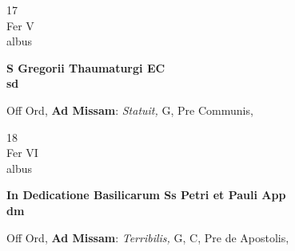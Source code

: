 \documentclass[10pt, openany]{book}
\begin{document}
        \begin{center}
            \begin{minipage}{3.5in}
                \vspace{2em}
                \begin{minipage}{0.5in}
                    {\Huge 17} \\
                    {\normalsize Fer V} \\
                    {\normalsize albus}
                \end{minipage}
                \begin{minipage}{3.0in}
                    \textbf{ \large S Gregorii Thaumaturgi EC \\
                    \textnormal{\normalsize sd}} \\ 
                \end{minipage}
                \begin{justify}Off Ord, \textbf{Ad Missam}: \textit{Statuit,} G, Pre Communis,  
                \end{justify}
            \end{minipage}
        \end{center}
    
        \begin{center}
            \begin{minipage}{3.5in}
                \vspace{2em}
                \begin{minipage}{0.5in}
                    {\Huge 18} \\
                    {\normalsize Fer VI} \\
                    {\normalsize albus}
                \end{minipage}
                \begin{minipage}{3.0in}
                    \textbf{ \large In Dedicatione Basilicarum Ss Petri et Pauli App \\
                    \textnormal{\normalsize dm}} \\ 
                \end{minipage}
                \begin{justify}Off Ord, \textbf{Ad Missam}: \textit{Terribilis,} G, C, Pre de Apostolis,  
                \end{justify}
            \end{minipage}
        \end{center}
    
\end{document}
